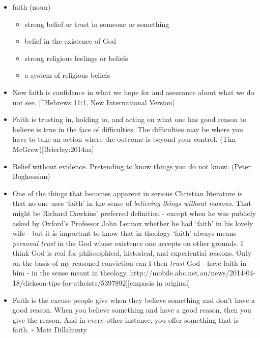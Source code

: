 \documentclass{tufte-book}
\begin{document}
\begin{itemize}
\itemsep1pt\parskip0pt
\item
  faith (noun)\citep{MerriamWebster2009}

  \begin{itemize}
  \itemsep1pt\parskip0pt
  \item
    strong belief or trust in someone or something
  \item
    belief in the existence of God
  \item
    strong religious feelings or beliefs
  \item
    a system of religious beliefs
  \end{itemize}
\item
  Now faith is confidence in what we hope for and assurance about what
  we do not see. {[}\^{}Hebrews 11:1, New International Version{]}
\item
  Faith is trusting in, holding to, and acting on what one has good
  reason to believe is true in the face of difficulties. The
  difficulties may be where you have to take an action where the outcome
  is beyond your control. (Tim McGrew){[}Brierley:2014aa{]}
\item
  Belief without evidence. Pretending to know things you do not know.
  (Peter Boghossian)\citep{Brierley:2014aa}
\item
  One of the things that becomes apparent in serious Christian
  literature is that no one uses `faith' in the sense of \emph{believing
  things without reasons}. That might be Richard Dawkins' preferred
  definition - except when he was publicly asked by Oxford's Professor
  John Lennox whether he had `faith' in his lovely wife - but it is
  important to know that in theology `faith' always means \emph{personal
  trust} in the God whose existence one accepts on other grounds. I
  think God is real for philosophical, historical, and experiential
  reasons. Only on the basis of my reasoned conviction can I then
  \emph{trust} God - have faith in him - in the sense meant in
  theology.{[}http://mobile.abc.net.au/news/2014-04-18/dickson-tips-for-atheists/5397892{]}{[}empasis
  in original{]}
\item
  Faith is the excuse people give when they believe something and don't
  have a good reason. When you believe something and have a good reason,
  then you give the reason. And in every other instance, you offer
  something that is faith. - Matt Dillahunty
\end{itemize}
\end{document}

